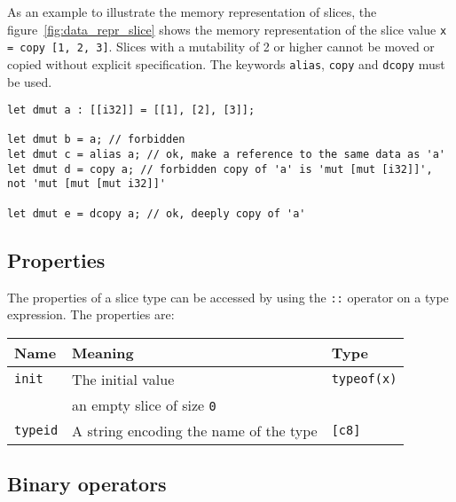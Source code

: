 As an example to illustrate the memory representation of slices, the
figure~\ref{fig:data_repr_slice} shows the memory representation of the slice
value \texttt{x = copy [1, 2, 3]}. Slices with a mutability of 2 or higher
cannot be moved or copied without explicit specification. The keywords
\texttt{alias}, \texttt{copy} and \texttt{dcopy} must be used.

\begin{lstlisting}[style=coloredverbatim]
let dmut a : [[i32]] = [[1], [2], [3]];

let dmut b = a; // forbidden
let dmut c = alias a; // ok, make a reference to the same data as 'a'
let dmut d = copy a; // forbidden copy of 'a' is 'mut [mut [i32]]', not 'mut [mut [mut i32]]'

let dmut e = dcopy a; // ok, deeply copy of 'a'
\end{lstlisting}



\subsection{Properties}

The properties of a slice type can be accessed by using the \texttt{::} operator on a type expression. The properties are:

\begin{center}\begin{adjustbox}{max width=\linewidth}
  \begin{tabular}{|l|ll|}
    \hline
    Name & Meaning & Type\\
    \hline
    \hline
    \texttt{init} & The initial value & \texttt{typeof(x)}\\
    & an empty slice of size \texttt{0} & \\
    \hline
    \texttt{typeid} & A string encoding the name of the type & \texttt{[c8]} \\
    \hline
  \end{tabular}
\end{adjustbox}\end{center}

\subsection{Binary operators}

